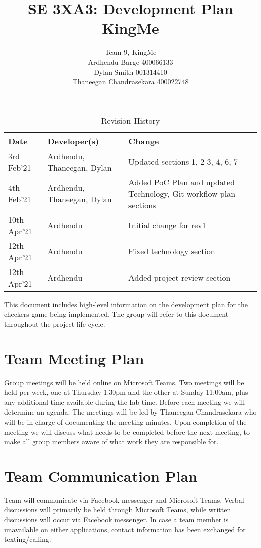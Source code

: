 \documentclass{article}
\title{SE 3XA3: Development Plan\\KingMe}
\author{Team 9, KingMe
		\\ Ardhendu Barge 400066133
		\\ Dylan Smith 001314410
		\\ Thaneegan Chandrasekara 400022748
}
\date{}
\begin{document}
\begin{table}[hp]
\caption{Revision History} \label{TblRevisionHistory}
\begin{tabularx}{\textwidth}{llX}
\toprule
\textbf{Date} & \textbf{Developer(s)} & \textbf{Change}\\
\midrule
3rd Feb'21 & Ardhendu, Thaneegan, Dylan & Updated sections 1, 2 3, 4, 6, 7\\
4th Feb'21 & Ardhendu, Thaneegan, Dylan & Added PoC Plan and updated Technology, Git workflow plan sections\\
10th Apr'21 & Ardhendu & Initial change for rev1\\
12th Apr'21 & Ardhendu & Fixed technology section\\
12th Apr'21 & Ardhendu & Added project review section\\
\bottomrule
\end{tabularx}
\end{table}

\newpage

\maketitle

This document includes high-level information on the development plan for the checkers game being implemented. The group will refer to this document throughout the project life-cycle.

\section{Team Meeting Plan}
Group meetings will be held online on Microsoft Teams. Two meetings will be held per week, one at Thursday 1:30pm and the other at Sunday 11:00am, plus any additional time available during the lab time. Before each meeting we will determine an agenda. The meetings will be led by Thaneegan Chandrasekara who will be in charge of documenting the meeting minutes. Upon completion of the meeting we will discuss what needs to be completed before the next meeting, to make all group members aware of what work they are responsible for.

\section{Team Communication Plan}
Team will communicate via Facebook messenger and Microsoft Teams. Verbal discussions will primarily be held through Microsoft Teams, while written discussions will occur via Facebook messenger. In case a team member is unavailable on either applications, contact information has been exchanged for texting/calling. 
\end{document}
